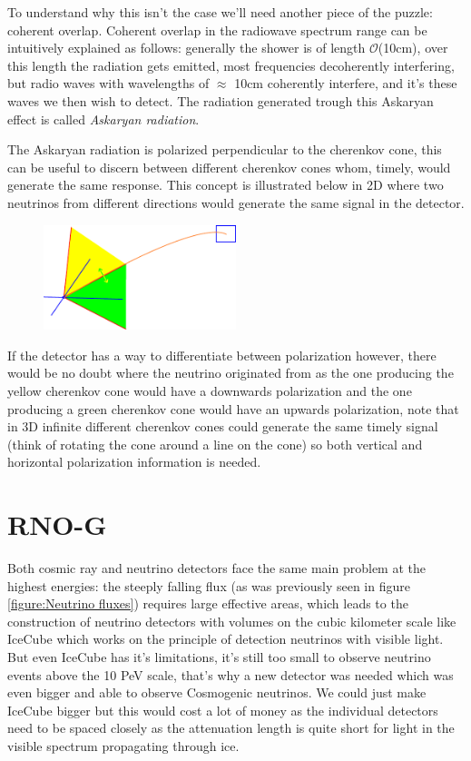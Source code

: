 \documentclass[11pt,a4paper,faculty=we,language=en,doctype=report]{cls/ugent-doc}
\begin{document}
To understand why this isn't the case we'll need another piece of the puzzle: coherent overlap.
Coherent overlap in the radiowave spectrum range can be intuitively explained as
follows: generally the shower is of length
$\mathcal{O}$(10cm)\cite{Huege_2017}, over this length the radiation gets
emitted, most frequencies decoherently interfering, but radio waves with wavelengths of 
$\approx$ 10cm coherently interfere, and it's these waves we then wish to detect.
The radiation generated trough this Askaryan effect is called \textit{Askaryan radiation}.

The Askaryan radiation is polarized perpendicular to the
cherenkov cone, this can be useful to discern between different cherenkov cones whom,
timely, would generate the same response. This concept is illustrated below in 2D where
two neutrinos from different directions would generate the same signal in the detector.

\begin{figure}[h!]
	\centering
	\includegraphics[width=0.5\textwidth]{illu_polarization.pdf}
\end{figure}

If the detector has a way to differentiate between polarization however, there would be no
doubt where the neutrino originated from as the one producing the yellow cherenkov cone
would have a downwards polarization and the one producing a green cherenkov cone would have
an upwards polarization, note that in 3D infinite different cherenkov cones could generate
the same timely signal (think of rotating the cone around a line on the cone) so both vertical
and horizontal polarization information is needed.


\section{RNO-G}
Both cosmic ray and neutrino detectors face the same main problem at the
highest energies: the steeply falling flux (as was previously seen in figure
\ref{figure:Neutrino fluxes}) requires large effective areas, which leads to
the construction of neutrino detectors with volumes on the cubic kilometer
scale like IceCube\cite{IceCubeTechnical} which works on the principle of
detection neutrinos with visible light.  But even IceCube has it's limitations,
it's still too small to observe neutrino events above the 10 PeV
scale\cite{IceCubeGen2}, that's why a new detector was needed which was even
bigger and able to observe Cosmogenic neutrinos.  We could just make IceCube
bigger but this would cost a lot of money as the individual detectors need to
be spaced closely as the attenuation length is quite short for light in the
visible spectrum propagating through ice.  
\end{document}
